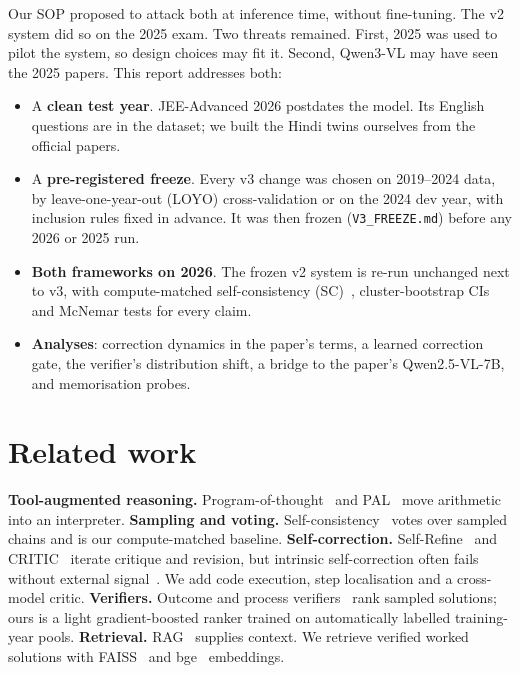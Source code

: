 \documentclass[conference]{IEEEtran}
\begin{document}
Our SOP proposed to attack both at inference time, without fine-tuning. The v2 system did so on
the 2025 exam. Two threats remained. First, 2025 was used to pilot the system, so design choices
may fit it. Second, Qwen3-VL may have seen the 2025 papers. This report addresses both:
\begin{itemize}
\item A \textbf{clean test year}. JEE-Advanced 2026 postdates the model. Its English questions are in
the dataset; we built the Hindi twins ourselves from the official papers.
\item A \textbf{pre-registered freeze}. Every v3 change was chosen on 2019--2024 data, by
leave-one-year-out (LOYO) cross-validation or on the 2024 dev year, with inclusion rules fixed
in advance. It was then frozen (\texttt{V3\_FREEZE.md}) before any 2026 or 2025 run.
\item \textbf{Both frameworks on 2026}. The frozen v2 system is re-run unchanged next to v3, with
compute-matched self-consistency (SC)~\cite{selfconsistency}, cluster-bootstrap CIs and McNemar
tests for every claim.
\item \textbf{Analyses}: correction dynamics in the paper's terms, a learned correction gate, the
verifier's distribution shift, a bridge to the paper's Qwen2.5-VL-7B, and memorisation probes.
\end{itemize}

\section{Related work}
\textbf{Tool-augmented reasoning.} Program-of-thought~\cite{pot} and PAL~\cite{pal} move
arithmetic into an interpreter.
\textbf{Sampling and voting.} Self-consistency~\cite{selfconsistency} votes over sampled chains
and is our compute-matched baseline.
\textbf{Self-correction.} Self-Refine~\cite{selfrefine} and CRITIC~\cite{critic} iterate critique
and revision, but intrinsic self-correction often fails without external
signal~\cite{cannotselfcorrect}. We add code execution, step localisation and a cross-model critic.
\textbf{Verifiers.} Outcome and process verifiers~\cite{cobbe,lightman} rank sampled solutions;
ours is a light gradient-boosted ranker trained on automatically labelled training-year pools.
\textbf{Retrieval.} RAG~\cite{rag} supplies context. We retrieve verified worked solutions with
FAISS~\cite{faiss} and bge~\cite{bge} embeddings.
\end{document}
